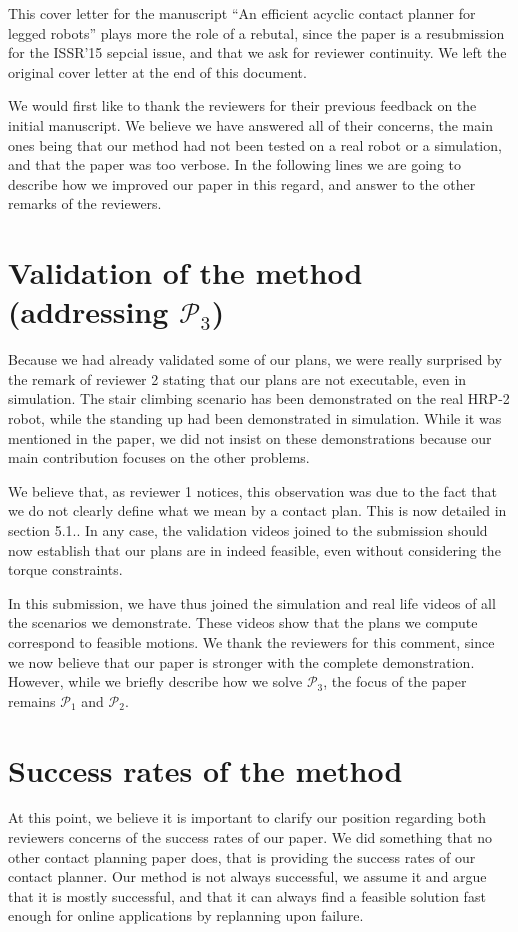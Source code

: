 \documentclass[12pt]{article}
\begin{document}
\maketitle

This cover letter for the manuscript ``An efficient acyclic contact planner for
legged robots'' plays more the role of a rebutal, since the paper is a resubmission for the ISSR'15 sepcial issue, and that we ask for reviewer continuity. We left the original cover
letter at the end of this document.

We would first like to thank the reviewers for their previous feedback on the initial manuscript. We believe we have answered
all of their concerns, the main ones being that our method had not been tested on a real robot or a simulation, and that the paper was too verbose.
In the following lines we are going to describe how we improved our paper in this regard, and answer to the other remarks of the reviewers.

\section{Validation of the method (addressing  $\mathcal{P}_3$) }
Because we had already validated some of our plans, we were really surprised by the remark of reviewer 2 stating that our plans are not executable, even in simulation.
The stair climbing scenario has been demonstrated
on the real HRP-2 robot, while the standing up had been demonstrated in simulation. While it was mentioned in the paper,
we did not insist on these demonstrations because our main contribution focuses on the other problems. 

We believe that, as reviewer 1 notices, this observation was due to the fact that we do not clearly define what we mean by a contact plan.
This is now detailed in section 5.1.. In any case, the validation videos joined to the submission should now establish that our plans are in indeed feasible, even without considering
the torque constraints.

In this submission, we have thus joined the simulation and real life videos of all the scenarios we demonstrate.
These videos show that the plans we compute correspond to feasible motions.
We thank the reviewers for this comment,
since we now believe that our paper is stronger with the complete demonstration. However, while we briefly describe how we solve $\mathcal{P}_3$, the focus of the 
paper remains $\mathcal{P}_1$ and $\mathcal{P}_2$.


\section{Success rates of the method}
At this point, we believe it is important to clarify our position regarding both reviewers concerns of the success rates of our paper.
We did something that no other contact planning paper does, that is providing the success rates of our contact planner. Our method is not always successful, we assume it and argue that it is mostly successful, and that it can always find a feasible solution fast enough for online applications by replanning upon failure.
\end{document}
